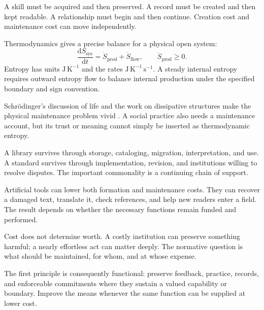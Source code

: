 A skill must be acquired and then preserved. A record must be created and then kept readable. A relationship must begin and then continue. Creation cost and maintenance cost can move independently.

Thermodynamics gives a precise balance for a physical open system:
\begin{equation}
 \frac{\mathrm d S_{\mathrm{sys}}}{\mathrm dt}
 =\dot S_{\mathrm{prod}}+\dot S_{\mathrm{flow}},
 \qquad \dot S_{\mathrm{prod}}\geq0.
\end{equation}
Entropy has units $\mathrm{J\,K^{-1}}$ and the rates $\mathrm{J\,K^{-1}\,s^{-1}}$. A steady internal entropy requires outward entropy flow to balance internal production under the specified boundary and sign convention.

Schrödinger's discussion of life and the work on dissipative structures make the physical maintenance problem vivid \cite{schrodinger1944,nicolis1977,prigogine1977nobel}. A social practice also needs a maintenance account, but its trust or meaning cannot simply be inserted as thermodynamic entropy.

A library survives through storage, cataloging, migration, interpretation, and use. A standard survives through implementation, revision, and institutions willing to resolve disputes. The important commonality is a continuing chain of support.

Artificial tools can lower both formation and maintenance costs. They can recover a damaged text, translate it, check references, and help new readers enter a field. The result depends on whether the necessary functions remain funded and performed.

Cost does not determine worth. A costly institution can preserve something harmful; a nearly effortless act can matter deeply. The normative question is what should be maintained, for whom, and at whose expense.

The first principle is consequently functional: preserve feedback, practice, records, and enforceable commitments where they sustain a valued capability or boundary. Improve the means whenever the same function can be supplied at lower cost.
